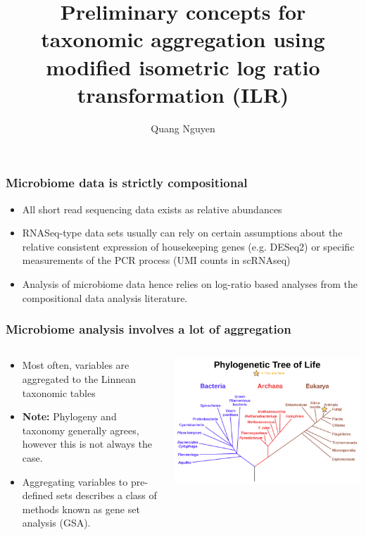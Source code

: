 \documentclass{beamer}
\title{Preliminary concepts for taxonomic aggregation using modified isometric log ratio transformation (ILR)}
\author{Quang Nguyen}
\institute{Dartmouth College}
\begin{document}
\begin{frame}
    \titlepage 
\end{frame}

\begin{frame}
    \frametitle{Microbiome data is strictly compositional}
    \begin{itemize}
        \item All short read sequencing data exists as relative abundances
        \item RNASeq-type data sets usually can rely on certain assumptions about the relative consistent expression of housekeeping genes (e.g. DESeq2) or specific measurements of the PCR process (UMI counts in scRNAseq)
        \item Analysis of microbiome data hence relies on log-ratio based analyses from the compositional data analysis literature.  
    \end{itemize}
\end{frame}

\begin{frame}
    \frametitle{Microbiome analysis involves a lot of aggregation}
    \begin{columns}
        \begin{column}{0.5\textwidth}
            \begin{itemize}
                \item Most often, variables are aggregated to the Linnean taxonomic tables 
                \item \textbf{Note:} Phylogeny and taxonomy generally agrees, however this is not always the case. 
                \item Aggregating variables to pre-defined sets describes a class of methods known as gene set analysis (GSA).  
            \end{itemize}
        \end{column}
        \begin{column}{0.5\textwidth}
            \begin{center}
                \includegraphics[scale=0.25]{taxonomic_tree.png}
            \end{center}
        \end{column}
    \end{columns}
\end{frame}
\end{document}
